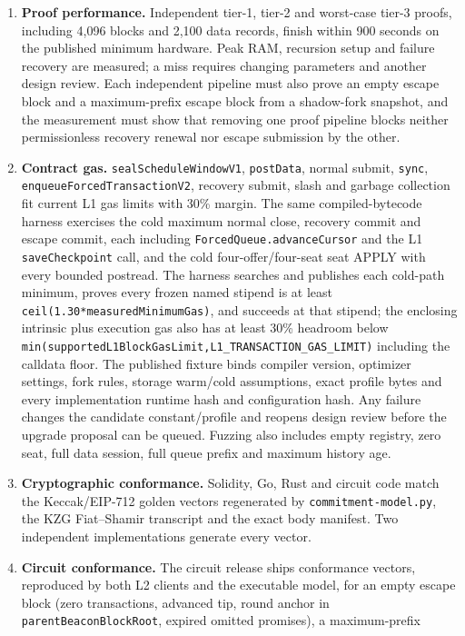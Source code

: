 \documentclass[a4paper,11pt]{article}
\newcommand{\code}[1]{\nolinkurl{#1}}
\begin{document}
\begin{enumerate}
\item \textbf{Proof performance.} Independent tier-1, tier-2 and worst-case
tier-3 proofs, including 4,096 blocks and 2,100 data records, finish within 900
seconds on the published minimum hardware.  Peak RAM, recursion setup and
failure recovery are measured; a miss requires changing parameters and another
design review.  Each independent pipeline must also prove an empty escape
block and a maximum-prefix escape block from a shadow-fork snapshot, and the
measurement must show that removing one proof pipeline blocks neither
permissionless recovery renewal nor escape submission by the other.
\item \textbf{Contract gas.} \code{sealScheduleWindowV1}, \code{postData}, normal submit,
\code{sync}, \code{enqueueForcedTransactionV2}, recovery submit, slash and
garbage collection fit current L1 gas limits with 30\% margin.  The same
compiled-bytecode harness exercises the cold maximum normal close, recovery
commit and escape commit, each including \code{ForcedQueue.advanceCursor} and
the L1 \code{saveCheckpoint} call, and the cold four-offer/four-seat seat APPLY
with every bounded postread.  The harness searches and publishes each cold-path
minimum, proves every frozen named stipend is at least
\code{ceil(1.30*measuredMinimumGas)}, and succeeds at that stipend; the
enclosing intrinsic plus execution gas also has at least 30\% headroom below
\code{min(supportedL1BlockGasLimit,L1_TRANSACTION_GAS_LIMIT)} including the
calldata floor.  The published fixture binds compiler version,
optimizer settings, fork rules, storage warm/cold assumptions, exact profile
bytes and every implementation runtime hash and configuration hash.  Any
failure changes the candidate constant/profile and reopens design review
before the upgrade proposal can be queued.  Fuzzing also includes empty
registry, zero seat, full data session, full queue prefix and maximum history
age.
\item \textbf{Cryptographic conformance.} Solidity, Go, Rust and circuit code
match the Keccak/EIP-712 golden vectors regenerated by
\code{commitment-model.py}, the KZG Fiat--Shamir transcript and the exact body
manifest.  Two independent implementations generate every vector.
\item \textbf{Circuit conformance.} The circuit release ships conformance
vectors, reproduced by both L2 clients and the executable model, for an empty
escape block (zero transactions, advanced tip, round anchor in
\code{parentBeaconBlockRoot}, expired omitted promises), a maximum-prefix

\end{enumerate}
\end{document}
